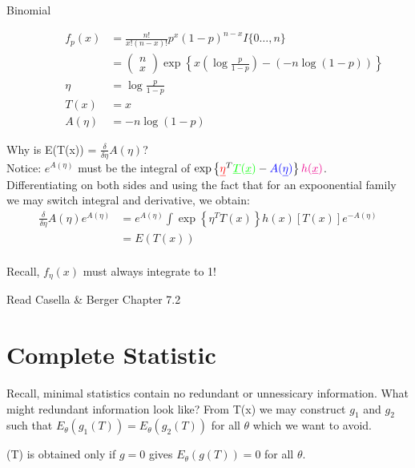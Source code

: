 \documentclass[11pt,fleqn]{book} %
\begin{document}
\begin{description}
		\item[Binomial]
		\begin{align*}
			f_p(x) &= \frac{n!}{x!(n-x)!}p^x(1-p)^{n-x}I\{0\dots,n\} \\
				&= \begin{pmatrix}  n \\  x  \end{pmatrix} \exp\left\{x(\log\frac{p}{1-p})-(-n\log(1-p)) \right\}\\
			\eta&=\log\frac{p}{1-p}\\
			T(x)&= x\\
			A(\eta)&= -n\log(1-p)
		\end{align*}

\end{description}

Why is E(T(x)) = $\frac{\delta}{\delta\eta}A(\eta)$?\\
Notice: $e^{A(\eta)}$ must be the integral of $\exp\left\{\textcolor{red}{\underline{\eta}}^T\textcolor{green}{\underline{T}(\underline{x})}-\textcolor{blue}{A(\underline{\eta})}\right\}\textcolor{magenta}{h(\underline{x})}$.\\
Differentiating on both sides and using the fact that for an expoonential family we may switch integral and derivative, we obtain:
\begin{align}
	\frac{\delta}{\delta\eta}A(\eta)e^{A(\eta)}&= e^{A(\eta)}\int\exp\left\{\eta^TT(x) \right\}h(x)[T(x)]e^{-A(\eta)}\\
	&= E(T(x))\\
\end{align}

Recall, $f_\eta (x)$ must always integrate to 1!

\begin{remark}
	Read Casella \& Berger Chapter 7.2
\end{remark}

\section{Complete Statistic}
Recall, minimal statistics contain no redundant or unnessicary information. What might redundant information look like? From T(x) we may construct $g_1$ and $g_2$ such that $E_\theta(g_1(T))=E_\theta(g_2(T))$ for all $\theta$ which we want to avoid.

\begin{definition} (T) is obtained only if $g=0$ gives $E_\theta(g(T))=0$ for all $\theta$. 
	
\end{definition}
\end{document}
